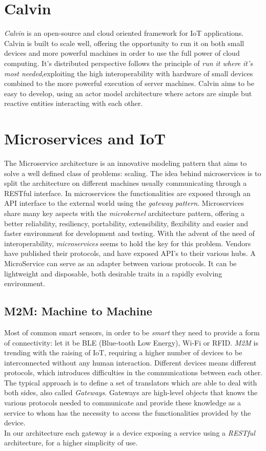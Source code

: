 \section{Calvin}

\textit{Calvin} is an open-source and cloud oriented framework
for IoT applications. Calvin is built to scale well, offering the opportunity
to run it on both small devices and more powerful machines in order to use the
full power of cloud computing. It's distributed perspective follows the principle
of \textit{run it where it's most needed},exploiting the high interoperability with
hardware of small devices combined to the more powerful execution of server machines.
Calvin aims to be easy to develop, using an actor model architecture where actors are
simple but reactive entities interacting with each other.

\section{Microservices and IoT}

The Microservice architecture is an innovative modeling pattern that aims
to solve a well defined class of problems: scaling.
The idea behind microservices is to split the architecture on different machines
usually communicating through a RESTful interface.
In microservices the
functionalities are exposed through an API interface to the external world using the
\textit{gateway pattern}. Microservices share many key aspects with the \textit{microkernel}
architecture pattern, offering a better reliability, resiliency, portability, extensibility,
flexibility and easier and faster environment for development and testing.
With the advent of the need of interoperability, \textit{microservices}
seems to hold the key for this problem.
Vendors have published their protocols, and have exposed API’s to their various hubs.
A MicroService can serve as an adapter between various protocols. It can be lightweight and disposable,
both desirable traits in a rapidly evolving environment.\cite{microiot}

\subsection{M2M: Machine to Machine}

Most of common smart sensors, in order to be \textit{smart} they need
to provide a form of connectivity: let it be BLE (Blue-tooth Low Energy),
Wi-Fi or RFID. \textit{M2M} is trending with the raising of IoT,
requiring a higher number of devices to be interconnected without
any human interaction. Different devices means different protocols,
which introduces difficulties in the communications between each other.
The typical approach is to define a set of translators which
are able to deal with both sides, also called \textit{Gateways}.
Gateways are high-level objects that knows the various protocols
needed to communicate and provide these knowledge as a service to
whom has the necessity to access the functionalities provided by the
device. \\
In our architecture each gateway is a device exposing a service using
a \textit{RESTful} architecture, for a higher simplicity of use.

